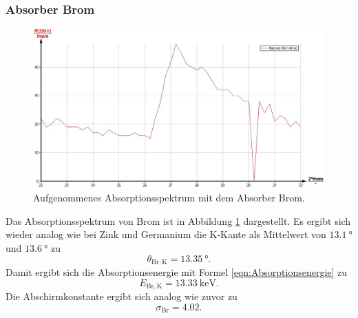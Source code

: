 \subsubsection{Absorber Brom}
\begin{figure}
	\centering
	\includegraphics[width=1.0\textwidth]{nIKO_und_jULIAN_ÜLADS/brom.jpg}
	\caption{Aufgenommenes Absorptionsspektrum mit dem Absorber Brom.}
	\label{fig:brom_absorber}
\end{figure}
Das Absorptionsspektrum von Brom ist in Abbildung \ref{fig:brom_absorber} dargestellt.
Es ergibt sich wieder analog wie bei Zink und Germanium die K-Kante als Mittelwert von
$\SI{13,1}{\degree}$ und $\SI{13,6}{\degree}$ zu
\begin{equation*}
	\theta_{\mathrm{Br,K}} = \SI{13,35}{\degree} \mathrm{.}
\end{equation*}
Damit ergibt sich die Absorptionsenergie mit Formel \eqref{eqn:Absorptionsenergie} zu
\begin{equation*}
	E_{\mathrm{Br,K}} = \SI{13,33}{\kilo\electronvolt} \mathrm{.}
\end{equation*}
Die Abschirmkonstante ergibt sich analog wie zuvor zu
\begin{equation*}
	\sigma_{\mathrm{Br}} = \num{4,02} \mathrm{.}
\end{equation*}

\FloatBarrier
